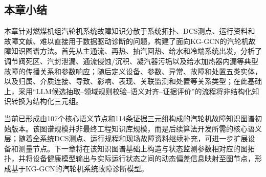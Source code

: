 \subsection{本章小结}

本章针对燃煤机组汽轮机系统故障知识分散于系统拓扑、DCS测点、运行资料和故障文献、难以直接用于数据驱动诊断的问题，构建了面向KG-GCN的汽轮机故障知识图谱方法。首先从主通流、再热、抽汽回热、给水和冷端系统出发，分析了调节阀死区、汽封泄漏、通流侵蚀/沉积、凝汽器污垢以及给水加热器内漏等典型故障的传播关系和参数响应；随后定义设备、参数、异常、故障和处置五类实体，以及归属、介质连接、导致、影响、表现、关联监测和处置等关系类型；在此基础上，采用“LLM候选抽取--领域规则校验--语义对齐--证据评价”的流程将非结构化知识转换为结构化三元组。

当前已形成由107个核心语义节点和114条证据三元组构成的汽轮机故障知识图谱初始版本。该图谱规模并非最终工程知识库规模，而是后续算法开发所需的核心语义层；随着全系统DCS测点、运行规程和现场故障资料继续补充，可进一步扩展设备和测量节点。下一章将在该知识图谱基础上构造与状态监测参数相对应的图拓扑，并将设备健康模型输出与实际运行状态之间的动态偏差信息映射至图节点，形成基于KG-GCN的汽轮机系统故障诊断模型。
